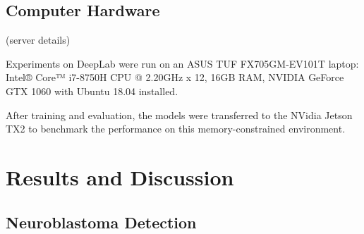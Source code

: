 \documentclass[journal]{IEEEtran}
\begin{document}
\subsection{Computer Hardware}
(server details)

Experiments on DeepLab were run on an ASUS TUF FX705GM-EV101T laptop: Intel® Core™ i7-8750H CPU @ 2.20GHz x 12, 16GB RAM, NVIDIA GeForce GTX 1060 with Ubuntu 18.04 installed.

After training and evaluation, the models were transferred to the NVidia Jetson TX2 to benchmark the performance on this memory-constrained environment.
\section{Results and Discussion}
\subsection{Neuroblastoma Detection}
\end{document}
